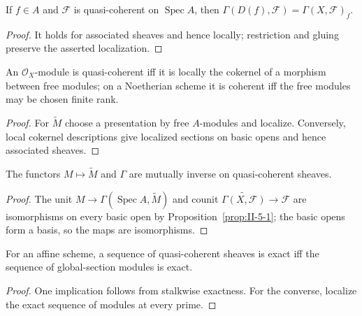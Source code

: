 \begin{lemma}
\label{lem:II-5-3}
If $f\in A$ and $\mathcal F$ is quasi-coherent on $\operatorname{Spec}A$, then
$\Gamma(D(f),\mathcal F)=\Gamma(X,\mathcal F)_f$.
\end{lemma}
\begin{proof}
It holds for associated sheaves and hence locally; restriction and gluing preserve the asserted
localization.
\end{proof}

\begin{proposition}
\label{prop:II-5-4}
An $\mathcal O_X$-module is quasi-coherent iff it is locally the cokernel of a morphism between free
modules; on a Noetherian scheme it is coherent iff the free modules may be chosen finite rank.
\end{proposition}
\begin{proof}
For $\widetilde M$ choose a presentation by free $A$-modules and localize. Conversely, local cokernel
descriptions give localized sections on basic opens and hence associated sheaves.
\end{proof}

\begin{corollary}
\label{cor:II-5-5}
The functors $M\mapsto\widetilde M$ and $\Gamma$ are mutually inverse on quasi-coherent sheaves.
\end{corollary}
\begin{proof}
The unit $M\to\Gamma(\operatorname{Spec}A,\widetilde M)$ and counit
$\widetilde{\Gamma(X,\mathcal F)}\to\mathcal F$ are isomorphisms on every basic open by
Proposition~\ref{prop:II-5-1}; the basic opens form a basis, so the maps are isomorphisms.
\end{proof}

\begin{proposition}
\label{prop:II-5-6}
For an affine scheme, a sequence of quasi-coherent sheaves is exact iff the sequence of global-section
modules is exact.
\end{proposition}
\begin{proof}
One implication follows from stalkwise exactness. For the converse, localize the exact sequence of
modules at every prime.
\end{proof}

